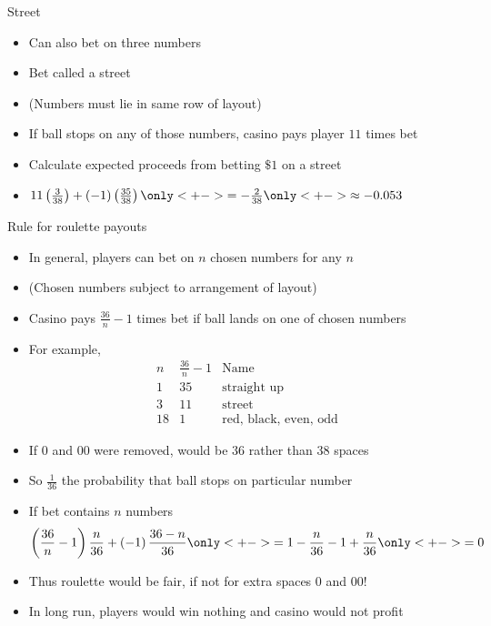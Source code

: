 \documentclass[handout]{beamer}
\theoremstyle{definition}
\begin{document}
\begin{frame}{Street}
\begin{itemize}
\item Can also bet on three numbers
\item Bet called a \alert{street}
\item (Numbers must lie in same row of \alert{layout})
\item If ball stops on any of those numbers, casino
pays player $11$ times bet
\item Calculate expected proceeds from betting $\$1$ on a street
\item $11\left(\frac{3}{38}\right)+\left(-1\right)\left(\frac{35}{38}\right)
\only<+->{=-\frac{2}{38}}
\only<+->{\approx -0.053}$
\end{itemize}
\end{frame}

\begin{frame}{Rule for roulette payouts} 
\begin{itemize}
\item In general, players can bet on $n$
chosen numbers for any $n$
\item (Chosen numbers subject to arrangement of layout)
\item Casino pays $\frac{36}{n}-1$ times
bet if ball lands on one of chosen numbers
\item For example,
\[\begin{array}{l|c|l}
n&\frac{36}{n}-1&\text{Name}\\\hline
1&35&\text{straight up}\\
3&11&\text{street}\\
18&1&\text{red, black, even, odd}
\end{array}\]
\end{itemize}
\end{frame}

\begin{frame}
\begin{itemize}
\item If $0$ and $00$ were removed, would be $36$ rather than $38$ spaces
\item So $\frac{1}{36}$ the probability that ball stops on particular number
\item If bet contains $n$ numbers
\[\left(\frac{36}{n}-1\right)\frac{n}{36}
+\left(-1\right)\frac{36-n}{36}
\only<+->{=1-\frac{n}{36}-1+\frac{n}{36}}
\only<+->{=0}\]
\item Thus roulette would be fair, if not for extra spaces $0$ and $00$!
\item In long run, players would win nothing and casino would not profit
\end{itemize}
\end{frame}
\end{document}
